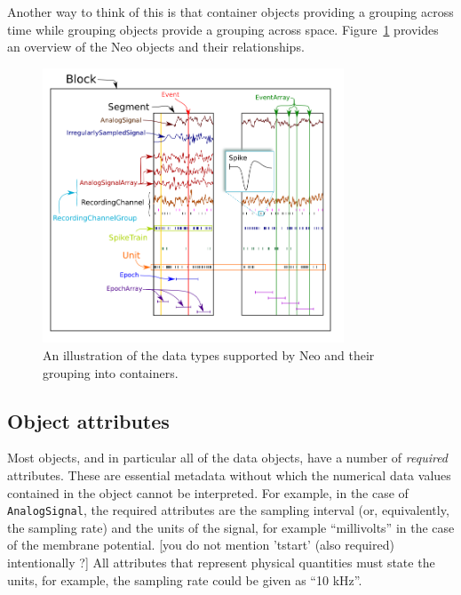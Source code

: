 \documentclass{frontiers}
\newcommand{\samuel}[1]{[\textcolor{RubineRed}{#1}]}
\begin{document}
Another way to think of this is that container objects providing a grouping across time while grouping objects provide a grouping across space.
Figure~\ref{fig:overview} provides an overview of the Neo objects and their relationships.


\begin{figure}
\centering
\includegraphics[width=0.8\textwidth]{figures/base_schematic2_lowres}
\caption{An illustration of the data types supported by Neo and their grouping into containers.}\label{fig:overview} 
\end{figure}
%
%
%


\subsection{Object attributes}

Most objects, and in particular all of the data objects, have a number of \emph{required} attributes.
These are essential metadata without which the numerical data values contained in the object cannot be interpreted.
For example, in the case of \lstinline`AnalogSignal`, the required attributes are the sampling interval (or, equivalently, the sampling rate) and the units of the signal, for example ``millivolts'' in the case of the membrane potential. \samuel{you do not mention 'tstart' (also required) intentionally ?} 
All attributes that represent physical quantities must state the units, for example, the sampling rate could be given as ``10 kHz''.
\end{document}
